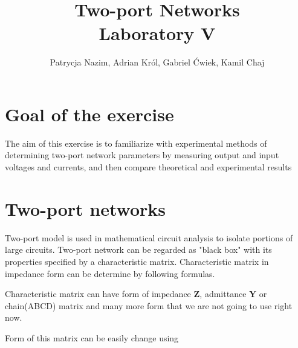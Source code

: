 \documentclass[notitlepage, a4paper, 11pt]{article}
\title{Two-port Networks\\
	\large Laboratory V}
\author{Patrycja Nazim, Adrian Król, Gabriel Ćwiek, Kamil Chaj}
\date{}
\begin{document}
	\maketitle
	\section{Goal of the exercise}
	The aim of this exercise is to familiarize with experimental methods of determining two-port network parameters by measuring output and input voltages and currents, and then compare theoretical and experimental results
	\section{Two-port networks}
	Two-port model is used in mathematical circuit analysis to isolate portions of large circuits. Two-port network can be regarded as "black box" with its properties specified by a characteristic matrix. Characteristic matrix in impedance form can be determine by following formulas.
	
	Characteristic matrix can have form of impedance $\mathbf{Z}$, admittance $\mathbf{Y}$ or chain(ABCD) matrix and many more form that we are not going to use right now. 
	
	Form of this matrix can be easily change using 
\end{document}
